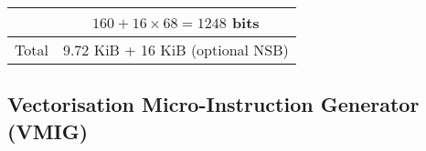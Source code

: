 \begin{table}[t]
{\begin{tabular}{|clll|}
\multicolumn{1}{|c|}{}                                                                & \multicolumn{3}{c|}{\cellcolor[rgb]{ .906,  .902,  .902}$160 + 16 \times 68 = 1248 $ bits}   \\ \hline
\multicolumn{1}{|c|}{Total}                                                                  & \multicolumn{3}{c|}{9.72 KiB + 16 KiB (optional NSB)}                               \\ \hline
\end{tabular}
}
\vspace{-10pt}
\end{table}

\subsection{Vectorisation Micro-Instruction Generator (VMIG)}
\vspace{-2pt}


